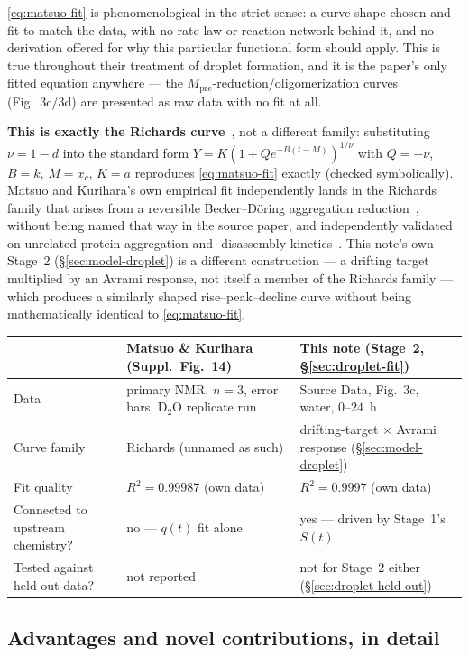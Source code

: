 \documentclass[11pt]{article}
\begin{document}
\eqref{eq:matsuo-fit} is phenomenological in the strict sense: a curve shape chosen and fit to
match the data, with no rate law or reaction network behind it, and no derivation offered for
why this particular functional form should apply. This is true throughout their treatment of
droplet formation, and it is the paper's only fitted equation anywhere --- the
$M_{\mathrm{pre}}$-reduction/oligomerization curves (Fig.~3c/3d) are presented as raw data
with no fit at all.

\textbf{This is exactly the Richards curve}~\cite{Richards1959}, not a different family:
substituting $\nu=1-d$
into the standard form
$Y=K(1+Qe^{-B(t-M)})^{1/\nu}$ with $Q=-\nu$, $B=k$, $M=x_c$, $K=a$ reproduces
\eqref{eq:matsuo-fit} exactly (checked symbolically). Matsuo and Kurihara's own empirical fit
independently lands in the Richards family that arises from a reversible Becker--D\"oring
aggregation reduction~\cite{SR}, without being named that way in the source paper, and
independently validated on unrelated protein-aggregation and -disassembly
kinetics~\cite{TTR}. This note's own Stage~2 (\S\ref{sec:model-droplet}) is a different
construction --- a drifting target multiplied by an Avrami response, not itself a member of
the Richards family --- which produces a similarly shaped rise--peak--decline curve without
being mathematically identical to \eqref{eq:matsuo-fit}.

\begin{center}
\begin{tabular}{p{3.2cm}p{4.7cm}p{4.7cm}}
\toprule
& Matsuo \& Kurihara (Suppl.\ Fig.~14) & This note (Stage~2, \S\ref{sec:droplet-fit})\\
\midrule
Data & primary NMR, $n=3$, error bars, D$_2$O replicate run & Source Data, Fig.~3c, water, $0$--$24$~h\\[2pt]
Curve family & Richards (unnamed as such) & drifting-target $\times$ Avrami response (\S\ref{sec:model-droplet})\\[2pt]
Fit quality & $R^2=0.99987$ (own data) & $R^2=0.9997$ (own data)\\[2pt]
Connected to upstream chemistry? & no --- $q(t)$ fit alone & yes --- driven by Stage~1's $S(t)$\\[2pt]
Tested against held-out data? & not reported & not for Stage~2 either (\S\ref{sec:droplet-held-out})\\
\bottomrule
\end{tabular}
\end{center}

\subsection{Advantages and novel contributions, in detail}
\label{sec:advantages}
\end{document}
